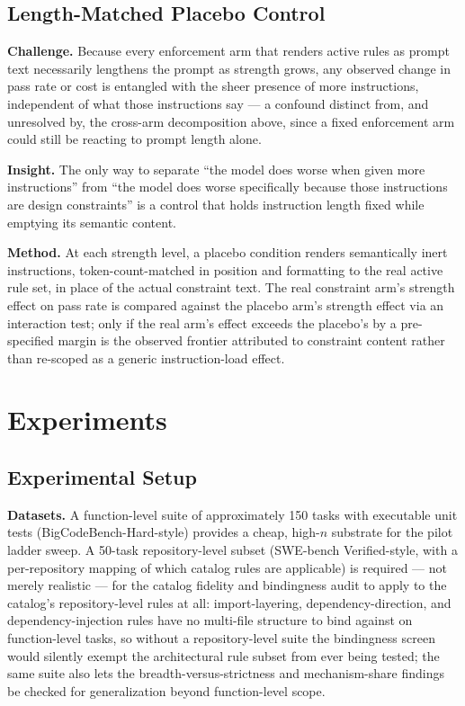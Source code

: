 \documentclass[11pt]{article}
\begin{document}
\subsection{Length-Matched Placebo Control}
\textbf{Challenge.} Because every enforcement arm that renders active rules as prompt text necessarily lengthens the prompt as strength grows, any observed change in pass rate or cost is entangled with the sheer presence of more instructions, independent of what those instructions say --- a confound distinct from, and unresolved by, the cross-arm decomposition above, since a fixed enforcement arm could still be reacting to prompt length alone.

\textbf{Insight.} The only way to separate ``the model does worse when given more instructions'' from ``the model does worse specifically because those instructions are design constraints'' is a control that holds instruction length fixed while emptying its semantic content.

\textbf{Method.} At each strength level, a placebo condition renders semantically inert instructions, token-count-matched in position and formatting to the real active rule set, in place of the actual constraint text. The real constraint arm's strength effect on pass rate is compared against the placebo arm's strength effect via an interaction test; only if the real arm's effect exceeds the placebo's by a pre-specified margin is the observed frontier attributed to constraint content rather than re-scoped as a generic instruction-load effect.

\section{Experiments}

\subsection{Experimental Setup}

\textbf{Datasets.} A function-level suite of approximately 150 tasks with executable unit tests (BigCodeBench-Hard-style) provides a cheap, high-$n$ substrate for the pilot ladder sweep. A 50-task repository-level subset (SWE-bench Verified-style, with a per-repository mapping of which catalog rules are applicable) is required --- not merely realistic --- for the catalog fidelity and bindingness audit to apply to the catalog's repository-level rules at all: import-layering, dependency-direction, and dependency-injection rules have no multi-file structure to bind against on function-level tasks, so without a repository-level suite the bindingness screen would silently exempt the architectural rule subset from ever being tested; the same suite also lets the breadth-versus-strictness and mechanism-share findings be checked for generalization beyond function-level scope.
\end{document}

